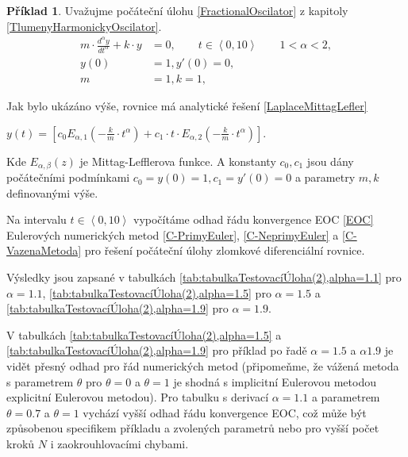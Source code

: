 \documentclass[a4paper,12pt,twoside]{article}
\theoremstyle{definition}
\newtheorem{prikl}[veta]{Příklad}
\theoremstyle{remark}
\numberwithin{equation}{section}
\numberwithin{table}{section}
\numberwithin{figure}{section}
\begin{document}
\begin{prikl}\label{TestUlohaOsciator}
	Uvažujme počáteční úlohu \eqref{FractionalOscilator} z kapitoly \ref{TlumenyHarmonickyOscilator}.
	\begin{equation*}
		\begin{aligned}
			m \cdot \frac{d^{\alpha} y}{d t^{\alpha}} + k \cdot y &= 0, \qquad t \in \left\langle 0, 10\right\rangle \qquad 1 < \alpha <2,  \\
			y\left(0\right) &= 1, y'\left(0\right) = 0, \\
			m &= 1, k = 1, 
		\end{aligned}
	\end{equation*}

	Jak bylo ukázáno výše, rovnice má analytické řešení \eqref{LaplaceMittagLefler}

	\begin{center}
		$	y\left(t\right) = \left[ c_{0} E_{\alpha, 1}\left(-\frac{k}{m}\cdot t^{\alpha}\right) + c_{1}\cdot t \cdot E_{\alpha, 2} \left(-\frac{k}{m}\cdot t ^{\alpha}\right)\right] .$
	\end{center}%

	Kde  $E_{\alpha, \beta}\left(z\right)$ je Mittag-Lefflerova funkce.
	A konstanty $c_{0}, c_{1}$ jsou dány počátečními  podmínkami $c_{0} = y\left(0\right) = 1, c_{1} = y'\left(0\right) = 0$ a parametry $m, k$ definovanými výše. 

	Na intervalu $t \in \left\langle 0, 10\right\rangle $ vypočítáme odhad řádu konvergence EOC \eqref{EOC} Eulerových numerických metod \eqref{C-PrimyEuler}, \eqref{C-NeprimyEuler} a \eqref{C-VazenaMetoda} pro řešení počáteční úlohy zlomkové diferenciální rovnice.
	
	Výsledky jsou zapsané v tabulkách \ref{tab:tabulkaTestovacíÚloha(2),alpha=1.1} pro $\alpha = 1.1$, \ref{tab:tabulkaTestovacíÚloha(2),alpha=1.5} pro $\alpha = 1.5$ a \ref{tab:tabulkaTestovacíÚloha(2),alpha=1.9} pro $\alpha = 1.9$. 
	
	V tabulkách \ref{tab:tabulkaTestovacíÚloha(2),alpha=1.5} a \ref{tab:tabulkaTestovacíÚloha(2),alpha=1.9} pro příklad  po řadě $\alpha = 1.5$ a $\alpha 1.9$  je vidět přesný odhad pro řád numerických metod (připomeňme, že vážená metoda s parametrem $\theta$ pro $\theta = 0$ a  $\theta = 1$ je shodná s implicitní Eulerovou metodou explicitní Eulerovou metodou). Pro tabulku s derivací $\alpha =1.1$ a parametrem $\theta = 0.7$ a $\theta = 1$ vychází vyšší odhad řádu konvergence EOC, což může být způsobenou specifikem příkladu a zvolených parametrů nebo pro vyšší počet kroků $N$ i zaokrouhlovacími chybami.
\end{prikl}
\end{document}
